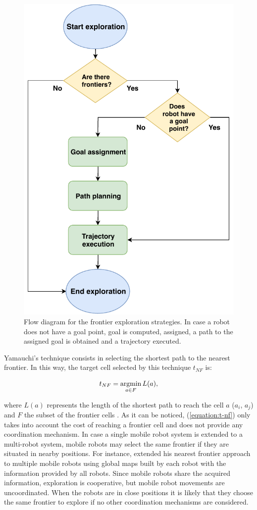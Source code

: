 \begin{figure}[t!]
	\centering\includegraphics[width=0.85\columnwidth]{./pictures/flow_diagram.pdf}
	\caption{Flow diagram for the frontier exploration strategies. In case a robot does not have a goal point, goal is computed, assigned, a path to the assigned goal is obtained and a trajectory executed.}
	\label{fig:flow_diagram}
\end{figure}

Yamauchi's technique consists in selecting the shortest path to the nearest frontier. In this way, the target cell selected by this technique $t_{NF}$ is:

\begin{equation}
t_{NF} = \operatorname*{argmin}_{a \in F} L(a), 
\label{equation:t-nf}
\end{equation}

where $L(a)$ represents the length of the shortest path to reach the cell $a$ ($a_{i}$, $a_{j}$) and $F$ the subset of the frontier cells \cite{Julia2012}. As it can be noticed, (\ref{equation:t-nf}) only takes into account the cost of reaching a frontier cell and does not provide any coordination mechanism. In case a single mobile robot system is extended to a multi-robot system, mobile robots may select the same frontier if they are situated in nearby positions. For instance, \cite{Yamauchi1998} extended his nearest frontier approach to multiple mobile robots using global maps built by each robot with the information provided by all robots. Since mobile robots share the acquired information, exploration is cooperative, but mobile robot movements are uncoordinated. When the robots are in close positions it is likely that they choose the same frontier to explore if no other coordination mechanisms are considered.

